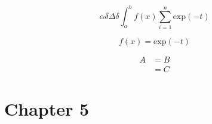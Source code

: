 \documentclass[12pt]{article}
\begin{document}
\newpage
$$ \alpha \delta \Delta \delta \int_a^b f(x) \sum_{i=1}^n \text{exp}(-t) $$

\begin{equation}
	f(x) = \text{exp}(-t)
\end{equation}

\begin{align}
	A &= B \\
	&= C
\end{align}

\section{Chapter 5}
\end{document}
